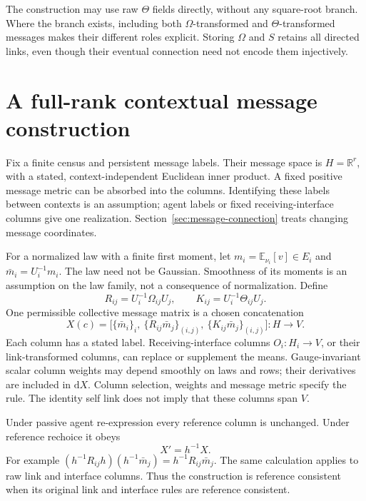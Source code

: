 \documentclass[11pt]{article}
\newcommand{\R}{\mathbb R}
\newcommand{\dd}{\mathrm d}
\newcommand{\E}{\mathbb E}
\begin{document}
The construction may use raw $\Theta$ fields directly, without any square-root branch. Where the branch exists, including both $\Omega$-transformed and $\Theta$-transformed messages makes their different roles explicit. Storing $\Omega$ and $S$ retains all directed links, even though their eventual connection need not encode them injectively.

\section{A full-rank contextual message construction}
\label{sec:messages}

Fix a finite census and persistent message labels. Their message space is $H=\R^r$, with a stated, context-independent Euclidean inner product. A fixed positive message metric can be absorbed into the columns. Identifying these labels between contexts is an assumption; agent labels or fixed receiving-interface columns give one realization. Section~\ref{sec:message-connection} treats changing message coordinates.

For a normalized law with a finite first moment, let $m_i=\E_{\nu_i}[v]\in E_i$ and $\bar m_i=U_i^{-1}m_i$. The law need not be Gaussian. Smoothness of its moments is an assumption on the law family, not a consequence of normalization. Define
\begin{equation}
 R_{ij}=U_i^{-1}\Omega_{ij}U_j,\qquad
 K_{ij}=U_i^{-1}\Theta_{ij}U_j.
\end{equation}
One permissible collective message matrix is a chosen concatenation
\begin{equation}
 X(c)=\bigl[\{\bar m_i\}_i,\ \{R_{ij}\bar m_j\}_{(i,j)},\
                    \{K_{ij}\bar m_j\}_{(i,j)}\bigr]:H\longrightarrow V.
 \label{eq:X-construction}
\end{equation}
Each column has a stated label. Receiving-interface columns $O_i:H_i\to V$, or their link-transformed columns, can replace or supplement the means. Gauge-invariant scalar column weights may depend smoothly on laws and rows; their derivatives are included in $\dd X$. Column selection, weights and message metric specify the rule. The identity self link does not imply that these columns span $V$.

Under passive agent re-expression every reference column is unchanged. Under reference rechoice it obeys
\begin{equation}
 X'=h^{-1}X.
 \label{eq:X-law}
\end{equation}
For example $(h^{-1}R_{ij}h)(h^{-1}\bar m_j)=h^{-1}R_{ij}\bar m_j$. The same calculation applies to raw link and interface columns. Thus the construction is reference consistent when its original link and interface rules are reference consistent.
\end{document}
